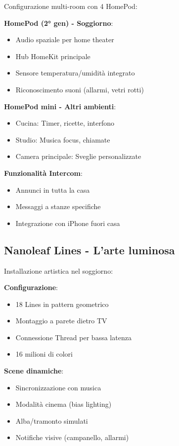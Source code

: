 Configurazione multi-room con 4 HomePod:

\textbf{HomePod (2° gen) - Soggiorno}:
\begin{itemize}
    \item Audio spaziale per home theater
    \item Hub HomeKit principale
    \item Sensore temperatura/umidità integrato
    \item Riconoscimento suoni (allarmi, vetri rotti)
\end{itemize}

\textbf{HomePod mini - Altri ambienti}:
\begin{itemize}
    \item Cucina: Timer, ricette, interfono
    \item Studio: Musica focus, chiamate
    \item Camera principale: Sveglie personalizzate
\end{itemize}

\textbf{Funzionalità Intercom}:
\begin{itemize}
    \item Annunci in tutta la casa
    \item Messaggi a stanze specifiche
    \item Integrazione con iPhone fuori casa
\end{itemize}

\subsection{Nanoleaf Lines - L'arte luminosa}

Installazione artistica nel soggiorno:

\textbf{Configurazione}:
\begin{itemize}
    \item 18 Lines in pattern geometrico
    \item Montaggio a parete dietro TV
    \item Connessione Thread per bassa latenza
    \item 16 milioni di colori
\end{itemize}

\textbf{Scene dinamiche}:
\begin{itemize}
    \item Sincronizzazione con musica
    \item Modalità cinema (bias lighting)
    \item Alba/tramonto simulati
    \item Notifiche visive (campanello, allarmi)
\end{itemize}

